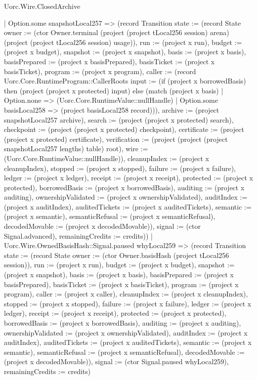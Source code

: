 \begin{lexlean}{Uorc.Wire.ClosedArchive}
\begin{semanticmodule}
{        | Option.some snapshotLocal257 => (record Transition {state := (record State {owner := (ctor Owner.terminal (project (project tLocal256 session) arena) (project (project tLocal256 session) usage)), run := (project x run), budget := (project x budget), snapshot := (project x snapshot), basis := (project x basis), basisPrepared := (project x basisPrepared), basisTicket := (project x basisTicket), program := (project x program), caller := (record Uorc.Core.RuntimeProgram::CallerRoots {input := (if (project x borrowedBasis) then (project (project x protected) input) else (match (project x basis)
          | Option.none => (Uorc.Core.RuntimeValue::nullHandle)
          | Option.some basisLocal258 => (project basisLocal258 record))), archive := (project snapshotLocal257 archive), search := (project (project x protected) search), checkpoint := (project (project x protected) checkpoint), certificate := (project (project x protected) certificate), verification := (project (project (project snapshotLocal257 lengths) table) root), wire := (Uorc.Core.RuntimeValue::nullHandle)}), cleanupIndex := (project x cleanupIndex), stopped := (project x stopped), failure := (project x failure), ledger := (project x ledger), receipt := (project x receipt), protected := (project x protected), borrowedBasis := (project x borrowedBasis), auditing := (project x auditing), ownershipValidated := (project x ownershipValidated), auditIndex := (project x auditIndex), auditedTickets := (project x auditedTickets), semantic := (project x semantic), semanticRefusal := (project x semanticRefusal), decodedMovable := (project x decodedMovable)}), signal := (ctor Signal.advanced), remainingCredits := credits}))
      | Uorc.Wire.OwnedBasisHash::Signal.paused whyLocal259 => (record Transition {state := (record State {owner := (ctor Owner.basisHash (project tLocal256 session)), run := (project x run), budget := (project x budget), snapshot := (project x snapshot), basis := (project x basis), basisPrepared := (project x basisPrepared), basisTicket := (project x basisTicket), program := (project x program), caller := (project x caller), cleanupIndex := (project x cleanupIndex), stopped := (project x stopped), failure := (project x failure), ledger := (project x ledger), receipt := (project x receipt), protected := (project x protected), borrowedBasis := (project x borrowedBasis), auditing := (project x auditing), ownershipValidated := (project x ownershipValidated), auditIndex := (project x auditIndex), auditedTickets := (project x auditedTickets), semantic := (project x semantic), semanticRefusal := (project x semanticRefusal), decodedMovable := (project x decodedMovable)}), signal := (ctor Signal.paused whyLocal259), remainingCredits := credits})
}
\end{semanticmodule}
\end{lexlean}
